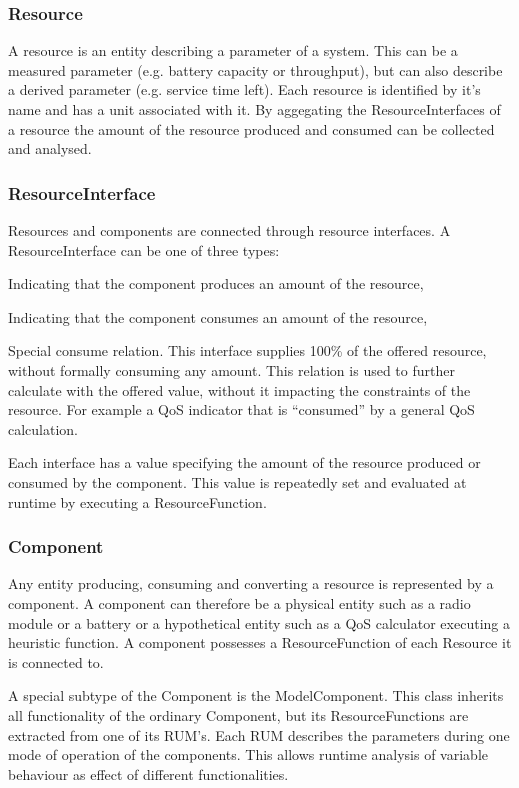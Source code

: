\subsubsection{Resource}
A resource is an entity describing a parameter of a system. This can be a measured parameter (e.g. battery capacity or throughput), but can also describe a derived parameter (e.g. service time left). Each resource is identified by it's name and has a unit associated with it. By aggegating the ResourceInterfaces of a resource the amount of the resource produced and consumed can be collected and analysed.

\subsubsection{ResourceInterface}
Resources and components are connected through resource interfaces. A ResourceInterface can be one of three types:
\begin{description}
\nospace
\item[Offer] Indicating that the component produces an amount of the resource,
\item[Consume] Indicating that the component consumes an amount of the resource,
\item[Calculate] Special consume relation. This interface supplies 100\% of the offered resource, without formally consuming any amount. This relation is used to further calculate with the offered value, without it impacting the constraints of the resource. For example a QoS indicator that is ``consumed'' by a general QoS calculation.
\end{description}
Each interface has a value specifying the amount of the resource produced or consumed by the component. This value is repeatedly set and evaluated at runtime by executing a ResourceFunction.

\subsubsection{Component}
Any entity producing, consuming and converting a resource is represented by a component. A component can therefore be a physical entity such as a radio module or a battery or a hypothetical entity such as a QoS calculator executing a heuristic function. A component possesses a ResourceFunction of each Resource it is connected to.

A special subtype of the Component is the ModelComponent. This class inherits all functionality of the ordinary Component, but its ResourceFunctions are extracted from one of its RUM's. Each RUM describes the parameters during one mode of operation of the components. This allows runtime analysis of variable behaviour as effect of different functionalities.

